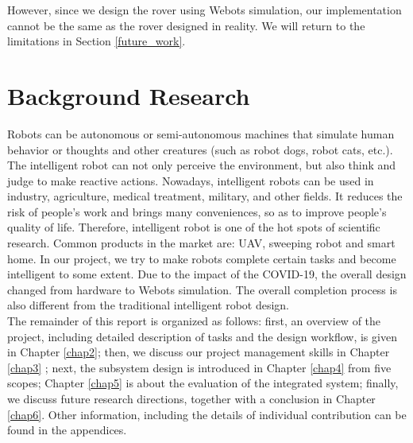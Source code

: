 However, since we design the rover using Webots simulation, our implementation cannot be the same as the rover designed in reality. We will return to the limitations in Section \ref{future_work}.

\section{Background Research}
Robots can be autonomous or semi-autonomous machines that simulate human behavior or thoughts and other creatures (such as robot dogs, robot cats, etc.)\cite{wiki}. The intelligent robot can not only perceive the environment, but also think and judge to make reactive actions. Nowadays, intelligent robots can be used in industry, agriculture, medical treatment, military, and other fields. \cite{kim2014robot} It reduces the risk of people's work and brings many conveniences, so as to improve people's quality of life. Therefore, intelligent robot is one of the hot spots of scientific research. Common products in the market are: UAV, sweeping robot and smart home. In our project, we try to make robots complete certain tasks and become intelligent to some extent. Due to the impact of the COVID-19, the overall design changed from hardware to Webots simulation. The overall completion process is also different from the traditional intelligent robot design.\\

The remainder of this report is organized as follows: first, an overview of the project, including detailed description of tasks and the design workflow, is given in Chapter \ref{chap2}; then, we discuss our project management skills in Chapter \ref{chap3} ; next, the subsystem design is introduced in Chapter \ref{chap4} from five scopes; Chapter \ref{chap5} is about the evaluation of the integrated system; finally, we discuss future research directions, together with a conclusion in Chapter \ref{chap6}. Other information, including the details of individual contribution can be found in the appendices.